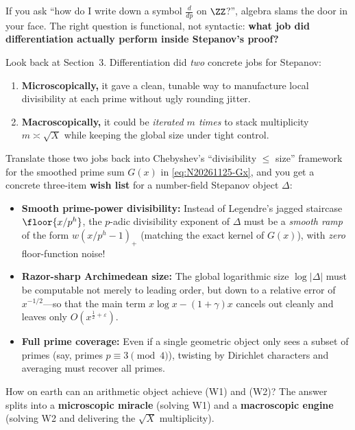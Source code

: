 \begin{moral}
If you ask ``how do I write down a symbol \(\frac{d}{dp}\) on \(\ZZ\)?'', algebra slams the door in your face. The right question is functional, not syntactic: \textbf{what job did differentiation actually perform inside Stepanov's proof?}
\end{moral}

Look back at Section~3. Differentiation did \emph{two} concrete jobs for Stepanov:
\begin{enumerate}
  \item \textbf{Microscopically,} it gave a clean, tunable way to manufacture local divisibility at each prime without ugly rounding jitter.
  \item \textbf{Macroscopically,} it could be \emph{iterated \(m\) times} to stack multiplicity \(m \asymp \sqrt{X}\) while keeping the global size under tight control.
\end{enumerate}

Translate those two jobs back into Chebyshev's ``divisibility \(\le\) size'' framework for the smoothed prime sum \(G(x)\) in \eqref{eq:N20261125-Gx}, and you get a concrete three-item \textbf{wish list} for a number-field Stepanov object \(\Delta\):
\begin{itemize}
  \item[\textbf{(W1)}] \textbf{Smooth prime-power divisibility:} Instead of Legendre's jagged staircase \(\floor{x/p^h}\), the \(p\)-adic divisibility exponent of \(\Delta\) must be a \emph{smooth ramp} of the form \(w(x/p^h - 1)_+\) (matching the exact kernel of \(G(x)\)), with \emph{zero} floor-function noise!
  \item[\textbf{(W2)}] \textbf{Razor-sharp Archimedean size:} The global logarithmic size \(\log|\Delta|\) must be computable not merely to leading order, but down to a relative error of \(x^{-1/2}\)---so that the main term \(x\log x - (1+\gamma)x\) cancels out cleanly and leaves only \(O(x^{\frac{1}{2}+\varepsilon})\).
  \item[\textbf{(W3)}] \textbf{Full prime coverage:} Even if a single geometric object only sees a subset of primes (say, primes \(p \equiv 3 \pmod 4\)), twisting by Dirichlet characters and averaging must recover all primes.
\end{itemize}

How on earth can an arithmetic object achieve (W1) and (W2)? The answer splits into a \textbf{microscopic miracle} (solving W1) and a \textbf{macroscopic engine} (solving W2 and delivering the \(\sqrt{X}\) multiplicity).

